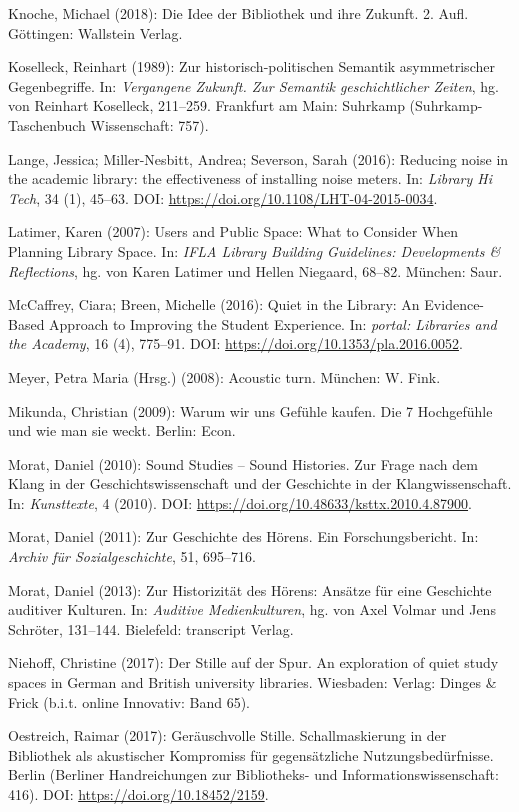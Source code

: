 \documentclass[a4paper,
fontsize=11pt,
oneside,
numbers=noperiodatend,
parskip=half-,
bibliography=totoc,
final
]{scrartcl}
\begin{document}
Knoche, Michael (2018): Die Idee der Bibliothek und ihre Zukunft. 2.
Aufl. Göttingen: Wallstein Verlag.

Koselleck, Reinhart (1989): Zur historisch-politischen Semantik
asymmetrischer Gegenbegriffe. In: \emph{Vergangene Zukunft. Zur Semantik
geschichtlicher Zeiten}, hg. von Reinhart Koselleck, 211--259. Frankfurt
am Main: Suhrkamp (Suhrkamp-Taschenbuch Wissenschaft: 757).

Lange, Jessica; Miller-Nesbitt, Andrea; Severson, Sarah (2016): Reducing
noise in the academic library: the effectiveness of installing noise
meters. In: \emph{Library Hi Tech}, 34 (1), 45--63. DOI:
\url{https://doi.org/10.1108/LHT-04-2015-0034}.

Latimer, Karen (2007): Users and Public Space: What to Consider When
Planning Library Space. In: \emph{IFLA Library Building Guidelines:
Developments \& Reflections}, hg. von Karen Latimer und Hellen Niegaard,
68--82. München: Saur.

McCaffrey, Ciara; Breen, Michelle (2016): Quiet in the Library: An
Evidence-Based Approach to Improving the Student Experience. In:
\emph{portal: Libraries and the Academy}, 16 (4), 775--91. DOI:
\url{https://doi.org/10.1353/pla.2016.0052}.

Meyer, Petra Maria (Hrsg.) (2008): Acoustic turn. München: W. Fink.

Mikunda, Christian (2009): Warum wir uns Gefühle kaufen. Die 7
Hochgefühle und wie man sie weckt. Berlin: Econ.

Morat, Daniel (2010): Sound Studies -- Sound Histories. Zur Frage nach
dem Klang in der Geschichtswissenschaft und der Geschichte in der
Klangwissenschaft. In: \emph{Kunsttexte}, 4 (2010). DOI:
\url{https://doi.org/10.48633/ksttx.2010.4.87900}.

Morat, Daniel (2011): Zur Geschichte des Hörens. Ein Forschungsbericht.
In: \emph{Archiv für Sozialgeschichte}, 51, 695--716.

Morat, Daniel (2013): Zur Historizität des Hörens: Ansätze für eine
Geschichte auditiver Kulturen. In: \emph{Auditive Medienkulturen}, hg.
von Axel Volmar und Jens Schröter, 131--144. Bielefeld: transcript
Verlag.

Niehoff, Christine (2017): Der Stille auf der Spur. An exploration of
quiet study spaces in German and British university libraries.
Wiesbaden: Verlag: Dinges \& Frick (b.i.t. online Innovativ: Band 65).

Oestreich, Raimar (2017): Geräuschvolle Stille. Schallmaskierung in der
Bibliothek als akustischer Kompromiss für gegensätzliche
Nutzungsbedürfnisse. Berlin (Berliner Handreichungen zur Bibliotheks-
und Informationswissenschaft: 416). DOI:
\url{https://doi.org/10.18452/2159}.
\end{document}
